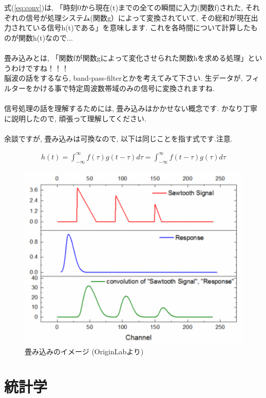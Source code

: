 \documentclass[11pt,a4paper]{jreport}
\begin{document}
式(\ref{eq:conv})は, 「時刻0から現在(t)までの全ての瞬間に入力(関数f)された, それぞれの信号が処理システム(関数g）によって変換されていて, その総和が現在出力されている信号h(t)である」を意味します. これを各時間について計算したものが関数h(t)なので...\\
\\
畳み込みとは, 「関数fが関数gによって変化させられた関数hを求める処理」というわけですね！！！\\
脳波の話をするなら, band-pass-filterとかを考えてみて下さい. 生データが, フィルターをかける事で特定周波数帯域のみの信号に変換されますね. \\
\\
信号処理の話を理解するためには, 畳み込みはかかせない概念です. かなり丁寧に説明したので, 頑張って理解してください.\\
\\
余談ですが, 畳み込みは可換なので, 以下は同じことを指す式です.注意.

\begin{eqnarray}
h(t) = \int^{\infty}_{-\infty} f(\tau) g(t - \tau) d\tau=
 \int^{\infty}_{-\infty} f(t-\tau) g(\tau) d\tau
\end{eqnarray}

\begin{figure}[H]
\label{im:convolution}
  \centering
  \includegraphics[width=120mm,bb=0 0 350 276]{figures/Convolution.png}
  \caption{畳み込みのイメージ (OriginLabより)}
\end{figure}

\chapter{統計学}
\end{document}
